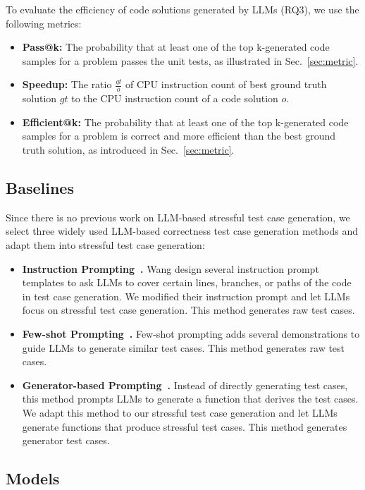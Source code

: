 To evaluate the efficiency of code solutions generated by LLMs (RQ3), we use the following metrics:
\begin{itemize}
    \item \textbf{Pass@k:} The probability that at least one of the top k-generated code samples for a problem passes the unit tests, as illustrated in Sec.~\ref{sec:metric}.
    \item \textbf{Speedup:} The ratio $\frac{gt}{o}$ of CPU instruction count of best ground truth solution $gt$ to the CPU instruction count of a code solution $o$.
    \item \textbf{Efficient@k:} The probability that at least one of the top k-generated code samples for a problem is correct and more efficient than the best ground truth solution, as introduced in Sec.~\ref{sec:metric}.
\end{itemize}


\subsection{Baselines}
Since there is no previous work on LLM-based stressful test case generation, we select three widely used LLM-based correctness test case generation methods and adapt them into stressful test case generation:
\begin{itemize}
    \item \textbf{Instruction Prompting~\cite{wang24testeval}.} Wang \etal design several instruction prompt templates to ask LLMs to cover certain lines, branches, or paths of the code in test case generation. We modified their instruction prompt and let LLMs focus on stressful test case generation. This method generates raw test cases.
    \item \textbf{Few-shot Prompting~\cite{ouédraogo24large}.} Few-shot prompting adds several demonstrations to guide LLMs to generate similar test cases. This method generates raw test cases.
    \item \textbf{Generator-based Prompting~\cite{liu24llm}.} Instead of directly generating test cases, this method prompts LLMs to generate a function that derives the test cases. We adapt this method to our stressful test case generation and let LLMs generate functions that produce stressful test cases. This method generates generator test cases.
\end{itemize}



\subsection{Models}


